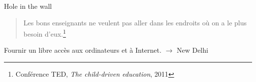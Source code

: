 \begin{frame}
    \pause
    \begin{block}{Hole in the wall}
    \begin{quote}
    Les bons enseignants ne veulent pas aller dans les endroits où on a le plus besoin d'eux.\footnote{Conférence TED, \textit{The child-driven education}, 2011}
    \end{quote}
    
      Fournir un libre accès aux ordinateurs et à Internet.
       $\rightarrow$ New Delhi
    \end{block}
\end{frame}

